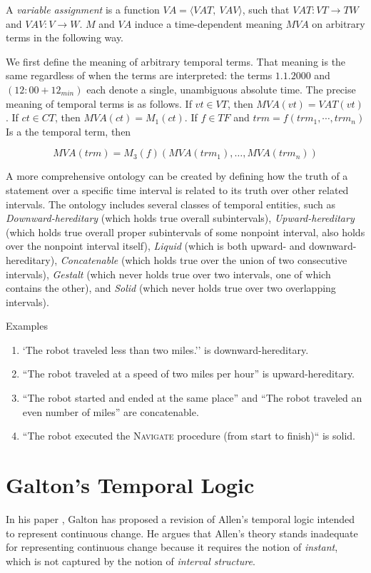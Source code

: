 A \textit{variable assignment} is a function $ VA = \langle VAT,\ VAV \rangle$, such that $VAT: VT \to TW$ and
$VAV: V \to W$. $M$ and $VA$ induce a time-dependent meaning $MVA$ on arbitrary terms in the following way.

We first define the meaning of arbitrary temporal terms. That meaning is the same regardless of when the terms are interpreted: the terms $1.1.2000$ and
$(12:00 + 12_{min})$ each denote a single, unambiguous absolute time. The precise
meaning of temporal terms is as follows. If $vt \in VT $, then $MVA (vt) = VAT (vt)$.
If $ct \in CT$, then $MVA (ct) = M_1(ct)$. If $f \in T F$ and $trm = f(trm_1, \cdots, trm_n)$ Is a
the temporal term, then

\[
	MVA(trm) = M_3(f)(MVA(trm_1), \dots, MVA(trm_n))
\]

A more comprehensive ontology can be created by defining how the truth of a statement over a specific time interval is related to its truth over other related intervals.
The ontology includes several classes of temporal entities, such as \textit{Downward-hereditary} (which holds true overall subintervals), \textit{Upward-hereditary} (which holds true overall proper subintervals of some nonpoint interval, also holds over the nonpoint interval itself),
\textit{Liquid} (which is both upward- and downward-hereditary), \textit{Concatenable} (which holds true over the union of two consecutive intervals),
\textit{Gestalt} (which never holds true over two intervals, one of which contains the other), and \textit{Solid} (which never holds true over two overlapping intervals).

\begin{exmp} Examples
	\begin{enumerate}
		\item `The robot traveled less than two miles.'' is downward-hereditary.
		\item ``The robot traveled at a speed of two miles per hour'' is upward-hereditary.
		\item ``The robot started and ended at the same place'' and ``The robot traveled an even number of miles'' are concatenable.
		\item ``The robot executed the \textsc{Navigate} procedure (from start to finish)`` is solid.
	\end{enumerate}
\end{exmp}


\section{Galton's Temporal Logic}
In his paper \cite{galton2004}, Galton has proposed a revision of Allen's temporal logic intended to represent continuous change.
He argues that Allen's theory stands inadequate for representing continuous change because it requires the notion of \textit{instant}, which is not captured by the notion of \textit{interval structure}.

